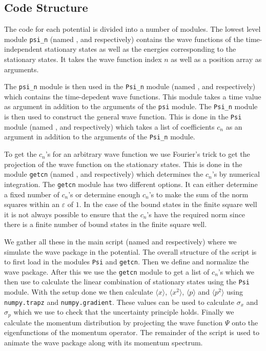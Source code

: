 \documentclass[12pt,a4paper]{article}
\renewcommand{\epsilon}{\varepsilon}
\begin{document}
\subsection{Code Structure}
The code for each potential is divided into a number of modules. The lowest level module \verb!psi_n! (named ,  and  respectively) contains the wave functions of the time-independent stationary states as well as the energies corresponding to the stationary states. It takes the wave function index $n$ as well as a position array as arguments.

The \verb!psi_n! module is then used in the \verb!Psi_n! module (named ,  and  respectively) which contains the time-depedent wave functions. This module takes a time value as argument in addition to the arguments of the \verb!psi! module.  The \verb!Psi_n! module is then used to construct the general wave function. This is done in the \verb!Psi! module (named ,  and  respectively) which takes a list of coefficients $c_n$ as an argument in addition to the arguments of the \verb!Psi_n! module.

To get the $c_n$'s for an arbitrary wave function we use Fourier's trick to get the projection of the wave function on the stationary states. This is done in the module \verb!getcn! (named ,  and  respectively) which determines the $c_n$'s by numerical integration. The \verb!getcn! module has two different options. It can either determine a fixed number of $c_n$'s or determine enough $c_n$'s to make the sum of the norm squares within an $\epsilon$ of $1$. In the case of the bound states in the finite square well it is not always possible to ensure that the $c_n$'s have the required norm since there is a finite number of bound states in the finite square well.

We gather all these in the main script (named  and  respectively) where we simulate the wave package in the potential.	The overall structure of the script is to first load in the modules \verb!Psi! and \verb!getcn!. Then we define and normalize the wave package. After this we use the \verb!getcn! module to get a list of $c_n$'s which we then use to calculate the linear combination of stationary states using the \verb!Psi! module. With the setup done we then calculate $\langle x \rangle$, $\langle x^2 \rangle$, $\langle p \rangle$ and $\langle p^2 \rangle$ using \lstinline{numpy.trapz} and \lstinline{numpy.gradient}. These values can be used to calculate $\sigma_x$ and $\sigma_p$ which we use to check that the uncertainty principle holds. Finally we calculate the momentum distribution by projecting the wave function $\Psi$ onto the eigenfunctions of the momentum operator. The remainder of the script is used to animate the wave package along with its momentum spectrum.
\end{document}
